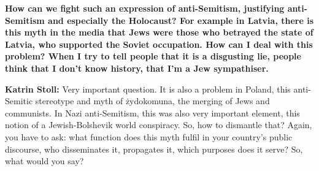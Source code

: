 



\textbf{How can we fight such an expression of anti-Semitism, justifying anti-Semitism and especially the Holocaust? For example in Latvia, there is this myth in the media that Jews were those who betrayed the state of Latvia, who supported the Soviet occupation. How can I deal with this problem? When I try to tell people that it is a disgusting lie, people think that I don't know history, that I'm a Jew sympathiser.}

\textbf{Katrin Stoll:} Very important question. It is also a problem in Poland, this anti-Semitic stereotype and myth of żydokomuna, the merging of Jews and communists. In Nazi anti-Semitism, this was also very important element, this notion of a Jewish-Bolshevik world conspiracy. So, how to dismantle that? Again, you have to ask: what function does this myth fulfil in your country’s public discourse, who disseminates it, propagates it, which purposes does it serve? So, what would you say? 


